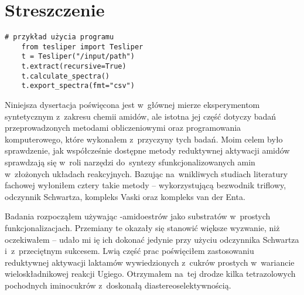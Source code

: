 \chapter{Streszczenie}\label{chapter:summary:pl}
\begin{marginscheme}
  
\end{marginscheme}
\begin{marginfigure}
  
\end{marginfigure}
\begin{marginlisting}
  \begin{lstlisting}[emph={recursive,fmt},numbers=none]
    # przykład użycia programu
    from tesliper import Tesliper
    t = Tesliper("/input/path")
    t.extract(recursive=True)
    t.calculate_spectra()
    t.export_spectra(fmt="csv")
  \end{lstlisting}
\end{marginlisting}

Niniejsza dysertacja poświęcona jest w~głównej mierze eksperymentom syntetycznym z~zakresu
  chemii amidów, ale istotna jej część dotyczy badań przeprowadzonych metodami obliczeniowymi
  oraz programowania komputerowego, które wykonałem z~przyczyny tych badań.
Moim celem było sprawdzenie, jak współcześnie dostępne metody reduktywnej aktywacji
  amidów sprawdzają się w~roli narzędzi do~syntezy sfunkcjonalizowanych amin w~złożonych
  układach reakcyjnych.
Bazując na~wnikliwych studiach literatury fachowej wyłoniłem cztery takie metody \---
  wykorzystującą bezwodnik triflowy, odczynnik Schwartza, kompleks Vaski oraz kompleks van der Enta.

Badania rozpocząłem używając \textbeta{}-amidoestrów jako substratów w~prostych funkcjonalizacjach.
Przemiany te okazały się stanowić większe wyzwanie, niż oczekiwałem \--- udało mi ię ich dokonać
  jedynie przy użyciu odczynnika Schwartza i~z~przeciętnym sukcesem.
Lwią część prac poświęciłem zastosowaniu reduktywnej aktywacji laktamów wywiedzionych z~cukrów
  prostych w~wariancie wieloskładnikowej reakcji Ugiego.
Otrzymałem na~tej drodze kilka tetrazolowych pochodnych iminocukrów z~doskonałą
  diastereoselektywnością.


